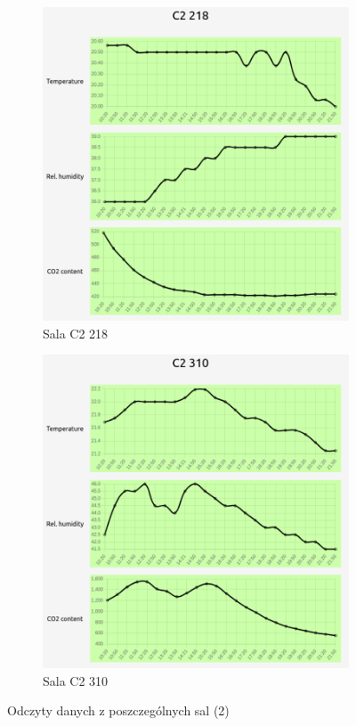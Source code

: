 \begin{figure}[H]
    \begin{subfigure}{0.5\textwidth}
        \centering
        \includegraphics[width=\linewidth]{zdj/app/readings-c2218.png}
        \caption{Sala C2 218}
        \label{c2-218}
    \end{subfigure}
    \begin{subfigure}{0.5\textwidth}
        \centering
        \includegraphics[width=\linewidth]{zdj/app/readings-c2310.png}
        \caption{Sala C2 310}
        \label{c2-310}
    \end{subfigure}
\caption{Odczyty danych z poszczególnych sal (2)}
\end{figure}

